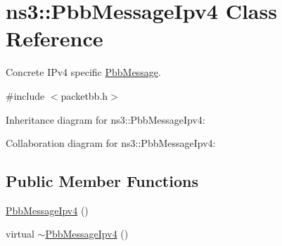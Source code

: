 \hypertarget{classns3_1_1PbbMessageIpv4}{}\section{ns3\+:\+:Pbb\+Message\+Ipv4 Class Reference}
\label{classns3_1_1PbbMessageIpv4}


Concrete I\+Pv4 specific \hyperlink{classns3_1_1PbbMessage}{Pbb\+Message}.  




{\ttfamily \#include $<$packetbb.\+h$>$}



Inheritance diagram for ns3\+:\+:Pbb\+Message\+Ipv4\+:


Collaboration diagram for ns3\+:\+:Pbb\+Message\+Ipv4\+:
\subsection*{Public Member Functions}
\begin{DoxyCompactItemize}
\item 
\hyperlink{classns3_1_1PbbMessageIpv4_a118e83ab7df9ced5f286f4207834dd43}{Pbb\+Message\+Ipv4} ()
\item 
virtual \hyperlink{classns3_1_1PbbMessageIpv4_a8dc7590defeb7c32cf65b6630eadd28a}{$\sim$\+Pbb\+Message\+Ipv4} ()
\end{DoxyCompactItemize}
